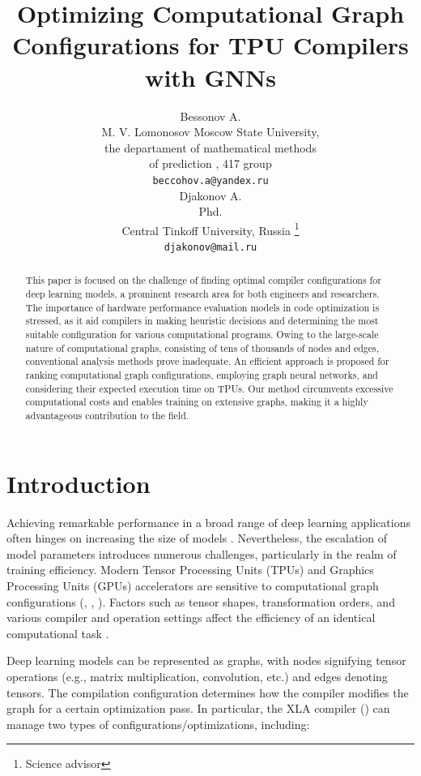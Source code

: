 \documentclass{article}
\title{Optimizing Computational Graph Configurations for TPU Compilers with GNNs}
\author{ Bessonov A. \\
	M. V. Lomonosov Moscow State University, \\
	the departament of mathematical methods \\ of prediction , 417 group\\
	\texttt{beccohov.a@yandex.ru} \\
	\And
        Djakonov A. \\
	Phd.         \\
	Central Tinkoff University, Russia \thanks{Science advisor} \\
	\texttt{djakonov@mail.ru} \\
}
\date{}
\begin{document}
\maketitle

\begin{abstract}
This paper is focused on the challenge of finding optimal compiler configurations for deep learning models, a prominent research area for both engineers and researchers. The importance of hardware performance evaluation models in code optimization is stressed, as it aid compilers in making heuristic decisions and determining the most suitable configuration for various computational programs. Owing to the large-scale nature of computational graphs, consisting of tens of thousands of nodes and edges, conventional analysis methods prove inadequate. An efficient approach is proposed for ranking computational graph configurations, employing graph neural networks, and considering their expected execution time on TPUs. Our method circumvents excessive computational costs and enables training on extensive graphs, making it a highly advantageous contribution to the field.

\end{abstract}


\section{Introduction}
Achieving remarkable performance in a broad range of deep learning applications often hinges on increasing the size of models \cite{kaplan2020scaling}. Nevertheless, the escalation of model parameters introduces numerous challenges, particularly in the realm of training efficiency. Modern Tensor Processing Units (TPUs) and Graphics Processing Units (GPUs) accelerators are sensitive to computational graph configurations (\cite{mangpo2023tpugraphs}, \cite{norrie2020google}, \cite{patterson201850}). Factors such as tensor shapes, transformation orders, and various compiler and operation settings affect the efficiency of an identical computational task \cite{kumar2019scale}.

Deep learning models can be represented as graphs, with nodes signifying tensor operations (e.g., matrix multiplication, convolution, etc.) and edges denoting tensors. The compilation configuration determines how the compiler modifies the graph for a certain optimization pass. In particular, the XLA compiler (\cite{artemev2022memory}) can manage two types of configurations/optimizations, including:
\end{document}
